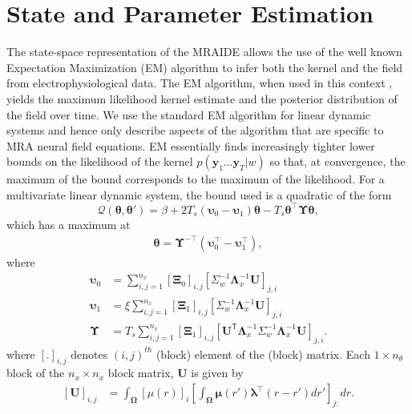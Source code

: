 \documentclass[journal,a4paper]{IEEEtran}
\begin{document}
\section{State and Parameter Estimation}
The state-space representation of the MRAIDE allows the use of the well known Expectation Maximization (EM) algorithm \cite{Dempster1977} to infer both the kernel and the field from electrophysiological data. The EM algorithm, when used in this context \cite{Dewar2009}, yields the maximum likelihood kernel estimate and the posterior distribution of the field over time. We use the standard EM algorithm for linear dynamic systems \cite{Gibsona2005,Roweis1999,Shumway2000} and hence only describe aspects of the algorithm that are specific to MRA neural field equations. EM essentially finds increasingly tighter lower bounds on the likelihood of the kernel $p(\mathbf{y}_1 \ldots \mathbf{y}_T|w)$ so that, at convergence, the maximum of the bound corresponds to the maximum of the likelihood. For a multivariate linear dynamic system, the bound used is a quadratic of the form
\begin{equation}
 \mathcal Q\left(\boldsymbol \theta,\boldsymbol\theta'\right)=\beta+2T_s\left(\boldsymbol\upsilon_0-\boldsymbol\upsilon_1\right)\boldsymbol\theta-T_s\boldsymbol\theta^\top\boldsymbol\Upsilon\boldsymbol\theta,
\end{equation}
which has a maximum at
\begin{align}
 \boldsymbol \theta= \boldsymbol\Upsilon^{-\top}(\boldsymbol\upsilon_0^\top-\boldsymbol\upsilon_1^\top),
\end{align}
where
\begin{align}\label{eq:upsilon0}
 \boldsymbol\upsilon_0 & =\sum_{i,j=1}^{n_x}[\boldsymbol\Xi_0]_{i,j}[\Sigma_{w}^{-1}\boldsymbol\Lambda_{x}^{-1}\mathbf U]_{j,i}\\ 
 \boldsymbol\upsilon_1 & =\xi\sum_{i,j=1}^{n_x}[\boldsymbol\Xi_1]_{i,j}[\Sigma_{w}^{-1}\boldsymbol\Lambda_{x}^{-1}\mathbf U]_{j,i}\label{eq:upsilon1} \\
 \boldsymbol\Upsilon&=T_s\sum_{i,j=1}^{n_x}[\boldsymbol\Xi_1]_{i,j}[\mathbf{U}^{\mathsf T} \boldsymbol\Lambda_{x}^{-1}\Sigma_{w}^{-1}\boldsymbol\Lambda_{x}^{-1}\mathbf{U}]_{j,i}\label{eq:Upsilon}.
\end{align}
where $[.]_{i,j}$ denotes $\left(i,j\right)^{th}$ (block) element of the (block) matrix. Each $1\times n_{\theta}$ block of the $n_x \times n_x$ block matrix,  $\mathbf U$ is given by
\begin{align}
\left[ \mathbf U\right] _{i,j}&=\int_{\boldsymbol \Omega}\left[\mu(r) \right]_i \left[\int_{\boldsymbol\Omega} \boldsymbol\mu\left(r'\right)\boldsymbol \lambda^\top \left(r-r'\right) dr'\right]_{j:} dr.
\end{align}
\end{document}
